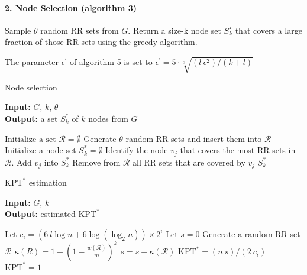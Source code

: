 \documentclass[a4paper,12pt]{article}
\begin{document}
\paragraph{2. Node Selection (algorithm 3)}
Sample $\theta$ random RR sets from $G$. Return a size-k node set $S_k^{\star}$ that covers a large fraction of those RR sets using the greedy algorithm.

The parameter $\epsilon^'$ of algorithm 5 is set to $\epsilon^{'} = 5 \cdot \sqrt[3]{(l \ \epsilon^{2}) / (k + l)}$

\begin{algorithm}
\caption{Node selection}\label{alg:oracle}
\hspace*{\algorithmicindent} \textbf{Input: } $G$, $k$, $\theta$\\
\hspace*{\algorithmicindent} \textbf{Output: } a set $S_k^*$ of $k$ nodes from $G$
\begin{algorithmic}[1]
\State $\text{Initialize a set } \mathcal{R} = \emptyset$
\State Generate $\theta$ random RR sets and insert them into $\mathcal{R}$
\State Initialize a node set $S_k^* = \emptyset$
\State Identify the node $v_j$ that covers the most RR sets in $\mathcal{R}$.
\State Add $v_j$ into $S_k^*$
\State Remove from $\mathcal{R}$ all RR sets that are covered by $v_j$
\EndFor
\State\Return $S_k^*$
\end{algorithmic}
\end{algorithm}

\begin{algorithm}
\caption{$\text{KPT}^*$ estimation}\label{alg:kptestimation}
\hspace*{\algorithmicindent} \textbf{Input: } $G$, $k$\\
\hspace*{\algorithmicindent} \textbf{Output: } estimated $\text{KPT}^*$
\begin{algorithmic}[1]
\State Let $c_i = (6 \ l\log n + 6\log(\log_2 n))\times 2^i$
\State Let $s = 0$
\State Generate a random RR set $\mathcal{R}$
\State $\kappa(R) = 1 - \left(1-\frac{w(\mathcal{R})}{m}\right)^k$
\State $s = s + \kappa(\mathcal{R})$
\EndFor
{}
\State\Return $\text{KPT}^* = (n \ s)/(2 \ c_i)$
\EndIf
\EndFor
\State\Return $\text{KPT}^* = 1$
\end{algorithmic}
\end{algorithm}
\end{document}
